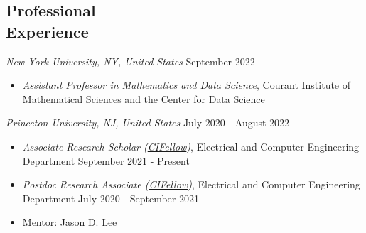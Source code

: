 \documentclass[margin, 10pt]{res} %
\begin{document}
\begin{resume}
\begin{comment} 
\textbf{Large-scale optimization:}
\begin{itemize}
	\item Efficient and scalable optimization algorithm design: exploiting problem's underlying structure
	\item Two-player games: customized adversarial robustness and generative adversarial network training 
	\item Distributed systems: gradient coding and asynchronous distributed learning 
\end{itemize}
\textbf{Representation Learning and Transfer Learning}
\begin{itemize}
\item Statistical learning theory of representation with supervised pretraining, fine-tuning and self-supervised learning
\item Application to meta-reinforcement learning 
\end{itemize}
Applications:
\begin{itemize}
	\item Inverse problems with generative models
\end{itemize}
\end{comment} 

\section{Professional\\Experience}
{\sl New York University, NY, United States} \hfill September 2022 - 
\begin{itemize}
	\item {\sl Assistant Professor in Mathematics and Data Science},  Courant Institute of Mathematical Sciences and the Center for Data Science 
\end{itemize} 

{\sl Princeton University, NJ, United States} \hfill July 2020 - August 2022
\begin{itemize}
	\item {\sl Associate Research Scholar (\href{https://cifellows2020.org/}{CIFellow})}, Electrical and Computer Engineering Department \hfill September 2021 - Present 
	\item {\sl Postdoc Research Associate (\href{https://cifellows2020.org/}{CIFellow})}, Electrical and Computer Engineering Department \hfill July 2020 - September 2021 
	\item Mentor: \href{https://jasondlee88.github.io/}{Jason D. Lee}
\end{itemize}



\end{resume}
\end{document}
